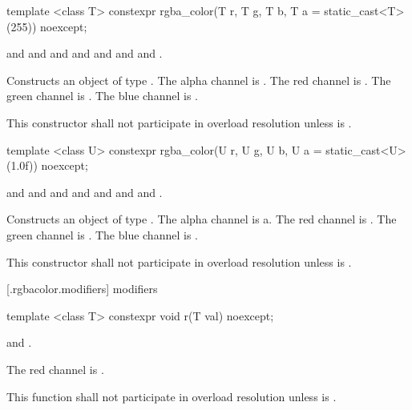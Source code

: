%
\begin{itemdecl}
template <class T>
constexpr rgba_color(T r, T g, T b, T a = static_cast<T>(255)) noexcept;
\end{itemdecl}
\begin{itemdescr}
\pnum
\requires
{} and  and  and  and  and  and  and .

\pnum
\effects
Constructs an object of type . The alpha channel is . The red channel is . The green channel is . The blue channel is .

\pnum
\remarks
This constructor shall not participate in overload resolution unless  is .
\end{itemdescr}

%
\begin{itemdecl}
template <class U>
constexpr rgba_color(U r, U g, U b, U a = static_cast<U>(1.0f)) noexcept;
\end{itemdecl}
\begin{itemdescr}
\pnum
\requires
{} and  and  and  and  and  and  and .

\pnum
\effects
Constructs an object of type . The alpha channel is {a}. The red channel is . The green channel is . The blue channel is .

\pnum
\remarks
This constructor shall not participate in overload resolution unless  is .
\end{itemdescr}


 [\iotwod.rgbacolor.modifiers]{ modifiers}

%
\begin{itemdecl}
template <class T>
constexpr void r(T val) noexcept;
\end{itemdecl}
\begin{itemdescr}
\pnum
\requires
{} and .

\pnum
\effects
The red channel is .

\pnum
\remarks
This function shall not participate in overload resolution unless  is .
\end{itemdescr}

